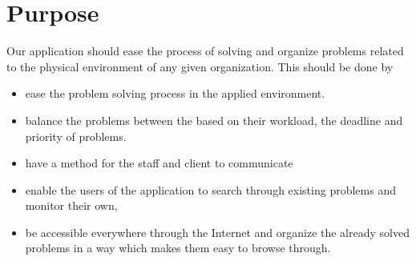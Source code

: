 \section{Purpose}
Our application should ease the process of solving and organize problems related to the physical environment of any given organization. This should be done by
\begin{itemize}
\item ease the problem solving process in the applied environment. 
\item balance the problems between the \astaff[] based on their workload, the deadline and priority of problems.
\item have a method for the staff and client to communicate
\item enable the users of the application to search through existing problems and monitor their own, 
\item be accessible everywhere through the Internet and organize the already solved problems in a way which makes them easy to browse through.
\end{itemize}